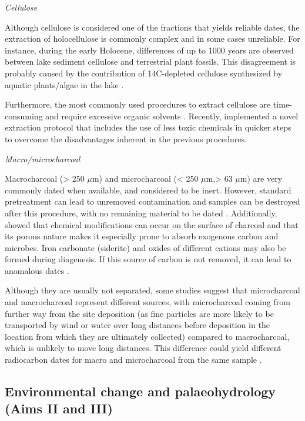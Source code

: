 \documentclass[
  12pt,
]{book}
\begin{document}
\emph{Cellulose}

Although cellulose is considered one of the fractions that yields reliable dates, the extraction of holocellulose is commonly complex and in some cases unreliable. For instance, during the early Holocene, differences of up to 1000 years are observed between lake sediment cellulose and terrestrial plant fossils. This disagreement is probably caused by the contribution of 14C-depleted cellulose synthesized by aquatic plants/algae in the lake \citep{kitagawaRadiocarbonConcentrationLake2007}.

Furthermore, the most commonly used procedures to extract cellulose are time-consuming and require excessive organic solvents \citep{wolfeProgressIsotopePaleohydrology2007}. Recently, \citet{gillespieNovelCellulosepreparationMethod2019} implemented a novel extraction protocol that includes the use of less toxic chemicals in quicker steps to overcome the disadvantages inherent in the previous procedures.

\emph{Macro/microcharcoal}

Macrocharcoal (\textgreater{} 250 \(\mu\)m) and microcharcoal (\textless{} 250 \(\mu\)m,\textgreater{} 63 \(\mu\)m) are very commonly dated when available, and considered to be inert. However, standard pretreatment can lead to unremoved contamination and samples can be destroyed after this procedure, with no remaining material to be dated \citep{birdIsotopesPyrogenicCarbon2012}. Additionally, \citet{birdCharcoal2007} showed that chemical modifications can occur on the surface of charcoal and that its porous nature makes it especially prone to absorb exogenous carbon and microbes. Iron carbonate (siderite) and oxides of different cations may also be formed during diagenesis. If this source of carbon is not removed, it can lead to anomalous dates \citep{birdCharcoal2007}.

Although they are usually not separated, some studies suggest that microcharcoal and macrocharcoal represent different sources, with microcharcoal coming from further way from the site deposition (as fine particles are more likely to be transported by wind or water over long distances before deposition in the location from which they are ultimately collected) compared to macrocharcoal, which is unlikely to move long distances. This difference could yield different radiocarbon dates for macro and microcharcoal from the same sample \citep{carcaillet2001comparison}.

\hypertarget{environmental-change-and-palaeohydrology-aims-ii-and-iii}{%
\subsection{Environmental change and palaeohydrology (Aims II and III)}\label{environmental-change-and-palaeohydrology-aims-ii-and-iii}}
\end{document}
